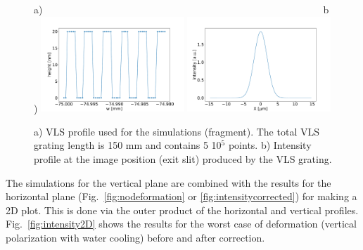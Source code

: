 \documentclass{iucr}
\begin{document}
  \begin{figure}
  \label{fig:grating} 
  \begin{flushleft}

  a)~~~~~~~~~~~~~~~~~~~~~~~~~~~~~~~~~~~~~~~~~~~~~~~~~~~~~~~~~b)
  \includegraphics[width=0.48\textwidth]{figures/grating.pdf} 
   \includegraphics[width=0.48\textwidth]{figures/intensitygrating.pdf}
  \end{flushleft}
  \caption{ a) VLS profile used for the simulations (fragment). The total VLS grating length is 150 mm and contains 5 10$^5$ points. b) Intensity profile at the image position (exit slit) produced by the VLS grating.}
  \end{figure}

The simulations for the vertical plane are combined with the results for the horizontal plane (Fig.~\ref{fig:nodeformation} or \ref{fig:intensitycorrected}) for making a 2D plot. This is done via the outer product of the horizontal and vertical profiles. Fig.~\ref{fig:intensity2D} shows the results for the worst case of deformation (vertical polarization with water cooling) before and after correction. 
\end{document}

